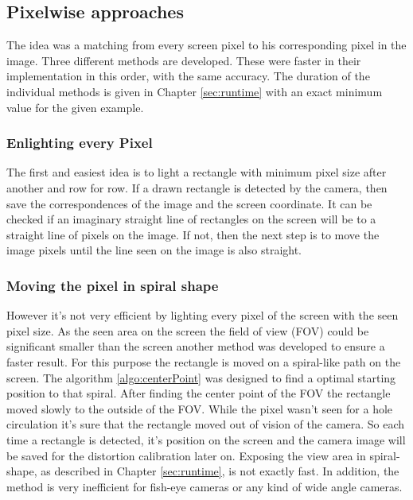 \documentclass[journal,final,a4paper,twoside]{PS}
\begin{document}
\subsection{Pixelwise approaches}
The idea was a matching from every screen pixel to his corresponding pixel in the image. Three different methods are developed. These were faster in their implementation in this order, with the same accuracy. The duration of the individual methods is given in Chapter \ref{sec:runtime} with an exact minimum value for the given example.
\subsubsection{Enlighting every Pixel}
The first and easiest idea is to light a rectangle with minimum pixel size after another and row for row. If a drawn rectangle is detected by the camera, then save the correspondences of the image and the screen coordinate. It can be checked if an imaginary straight line of rectangles on the screen will be to a straight line of pixels on the image. If not, then the next step is to move the image pixels until the line seen on the image is also straight.
\subsubsection{Moving the pixel in spiral shape}
However it's not very efficient by lighting every pixel of the screen with the seen pixel size. As the seen area on the screen the field of view (FOV) could be significant smaller than the screen another method was developed to ensure a faster result. For this purpose  the rectangle is moved on a spiral-like path on the screen. The algorithm \ref{algo:centerPoint} was designed to find a optimal starting position to that spiral. After finding the center point of the FOV the rectangle moved slowly to the outside of the FOV. While the pixel wasn't seen for a hole circulation it's sure that the rectangle moved out of vision of the camera. So each time a rectangle is detected, it's position on the screen and the camera image will be saved for the distortion calibration later on. Exposing the view area in spiral-shape, as described in Chapter \ref{sec:runtime}, is not exactly fast. In addition, the method is very inefficient for fish-eye cameras or any kind of wide angle cameras. 

\end{document}
